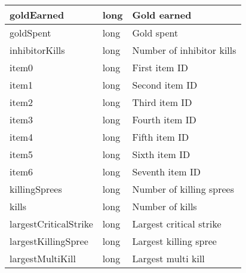 \begin{table}[!h]
\begin{tabular}{llp{5cm}}
goldEarned                      & long               & Gold earned                                                                     \\ \hline
goldSpent                       & long               & Gold spent                                                                      \\ \hline
inhibitorKills                  & long               & Number of inhibitor kills                                                       \\ \hline
item0                           & long               & First item ID                                                                   \\ \hline
item1                           & long               & Second item ID                                                                  \\ \hline
item2                           & long               & Third item ID                                                                   \\ \hline
item3                           & long               & Fourth item ID                                                                  \\ \hline
item4                           & long               & Fifth item ID                                                                   \\ \hline
item5                           & long               & Sixth item ID                                                                   \\ \hline
item6                           & long               & Seventh item ID                                                                 \\ \hline
killingSprees                   & long               & Number of killing sprees                                                        \\ \hline
kills                           & long               & Number of kills                                                                 \\ \hline
largestCriticalStrike           & long               & Largest critical strike                                                         \\ \hline
largestKillingSpree             & long               & Largest killing spree                                                           \\ \hline
largestMultiKill                & long               & Largest multi kill                                                              \\ \hline

\end{tabular}
\end{table}
